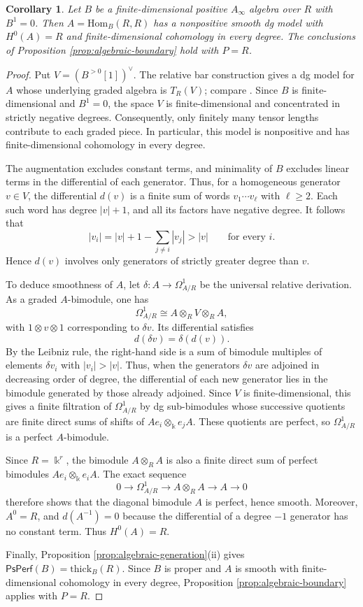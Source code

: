 \documentclass[11pt,letterpaper,reqno]{amsart}
\theoremstyle{plain}
\newtheorem{corollary}[corollary]{Corollary}
\theoremstyle{definition}
\theoremstyle{plain}
\theoremstyle{definition}
\numberwithin{equation}{section}
\begin{document}
\begin{corollary}\label{cor:positive-smooth-dual}
Let $B$ be a finite-dimensional positive $A_\infty$ algebra over $R$ with $B^1=0$.
Then $A=\mathrm{Hom}_B(R,R)$ has a nonpositive smooth dg model with $H^0(A)=R$ and finite-dimensional cohomology in every degree.
The conclusions of Proposition \ref{prop:algebraic-boundary} hold with $P=R$.
\end{corollary}
\begin{proof}
Put $V=(B^{>0}[1])^\vee$.
The relative bar construction gives a dg model for $A$ whose underlying graded algebra is $T_R(V)$; compare \cite[Section 2.2 and Lemma 5.3(b)]{Lu-Palmieri-Wu-Zhang2008}.
Since $B$ is finite-dimensional and $B^1=0$, the space $V$ is finite-dimensional and concentrated in strictly negative degrees.
Consequently, only finitely many tensor lengths contribute to each graded piece. In particular, this model is nonpositive and has finite-dimensional cohomology in every degree.

The augmentation excludes constant terms, and minimality of $B$ excludes linear terms in the differential of each generator.
Thus, for a homogeneous generator $v\in V$, the differential $d(v)$ is a finite sum of words $v_1\cdots v_\ell$ with $\ell\geqslant2$.
Each such word has degree $|v|+1$, and all its factors have negative degree.
It follows that
\[
|v_i|
=|v|+1-\sum_{j\ne i}|v_j|
>|v|
\qquad\text{for every }i.
\]
Hence $d(v)$ involves only generators of strictly greater degree than $v$.

To deduce smoothness of $A$, let $\delta:A\to\Omega^1_{A/R}$ be the universal relative derivation.
As a graded $A$-bimodule, one has
\[
\Omega^1_{A/R}\cong A\otimes_R V\otimes_R A,
\]
with $1\otimes v\otimes1$ corresponding to $\delta v$.
Its differential satisfies
\[
d(\delta v)=\delta(d(v)).
\]
By the Leibniz rule, the right-hand side is a sum of bimodule multiples of elements $\delta v_i$ with $|v_i|>|v|$.
Thus, when the generators $\delta v$ are adjoined in decreasing order of degree, the differential of each new generator lies in the bimodule generated by those already adjoined.
Since $V$ is finite-dimensional, this gives a finite filtration of $\Omega^1_{A/R}$ by dg sub-bimodules whose successive quotients are finite direct sums of shifts of $Ae_i\otimes_{\Bbbk}e_jA$.
These quotients are perfect, so $\Omega^1_{A/R}$ is a perfect $A$-bimodule.

Since $R=\Bbbk^r$, the bimodule $A\otimes_R A$ is also a finite direct sum of perfect bimodules $Ae_i\otimes_{\Bbbk}e_iA$.
The exact sequence
\[
0\longrightarrow\Omega^1_{A/R}
\longrightarrow A\otimes_R A
\longrightarrow A
\longrightarrow0
\]
therefore shows that the diagonal bimodule $A$ is perfect, hence smooth.
Moreover, $A^0=R$, and $d(A^{-1})=0$ because the differential of a degree $-1$ generator has no constant term.
Thus $H^0(A)=R$.

Finally, Proposition \ref{prop:algebraic-generation}(ii) gives $\mathsf{PsPerf}(B)=\mathrm{thick}_B(R)$.
Since $B$ is proper and $A$ is smooth with finite-dimensional cohomology in every degree, Proposition \ref{prop:algebraic-boundary} applies with $P=R$.
\end{proof}
\end{document}
